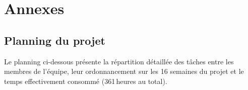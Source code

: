 \section{Annexes}

\newcommand{\annexepdf}[2][]{%
}

\newcommand{\annexepdfpaysage}[1]{%
}

\subsection{Planning du projet}
\label{annexe:planning}

Le planning ci-dessous présente la répartition détaillée des tâches entre
les membres de l'équipe, leur ordonnancement sur les 16 semaines du projet
et le temps effectivement consommé (361\,heures au total).

\clearpage
\annexepdfpaysage{assets/Planning.pdf}
